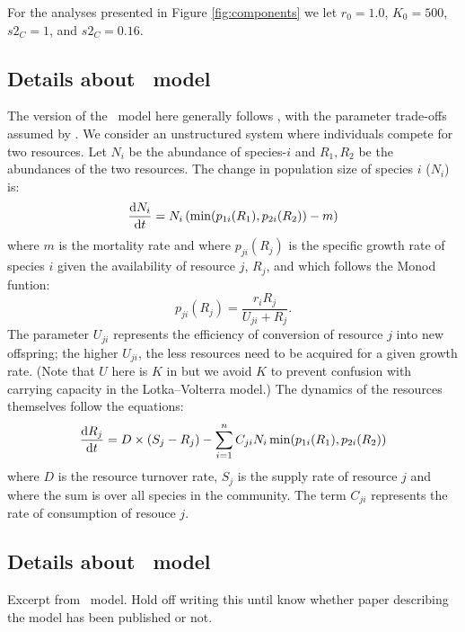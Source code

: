 \documentclass[a4paper,11pt]{article}
\begin{document}
For the analyses presented in Figure \ref{fig:components} we let $r_0=1.0$, $K_0=500$,
 $s2_C=1$, and $s2_C=0.16$.

\subsection{Details about \Rstar\ model}\label{sec:Rstar}

The version of the \Rstar\ model here generally follows
\citet{Huisman-2001}, with the parameter trade-offs assumed by
\citet{Fox-2008}.
%
We consider an unstructured system where individuals compete for two
resources. Let $N_i$ be the abundance of species-$i$ and $R_1, R_2$ be
the abundances of the two resources.
%
The change in population size of species $i$ ($N_i$) is:
\begin{equation}
  \label{eq:rstar-n}
  \frac{\mathrm{d} N_i}{\mathrm{d} t} = N_i \, (\min(p_{1i}(R_1), p_{2i}(R_2)) - m)
\end{equation}
where $m$ is the mortality rate and where $p_{ji}(R_j)$ is the
specific growth rate of species $i$ given the availability of resource
$j$, $R_j$, and which follows the Monod funtion:
\begin{equation}
  \label{eq:rstar-p}
  p_{ji}(R_j) = \frac{r_i R_j}{U_{ji} + R_j}.
\end{equation}
%
The parameter $U_{ji}$ represents the efficiency of conversion of
resource $j$ into new offspring; the higher $U_{ji}$, the less
resources need to be acquired for a given growth rate.  (Note that $U$
here is $K$ in \citealt{Huisman-2001} but we avoid $K$ to prevent
confusion with carrying capacity in the Lotka--Volterra model.)
%
The dynamics of the resources themselves follow the equations:
\begin{equation}
  \label{eq:rstar-r}
  \frac{\mathrm{d} R_j}{\mathrm{d} t} =
  D \times (S_j - R_j) - \sum_{i=1}^n {C_{ji} N_i
    \min(p_{1i}(R_1), p_{2i}(R_2))}
\end{equation}
where $D$ is the resource turnover rate, $S_j$ is the supply rate of
resource $j$ and where the sum is over all species in the community.
The term $C_{ji}$ represents the rate of consumption of resouce $j$.


\subsection{Details about \plant\ model}\label{sec:plant}

Excerpt from  \plant\ model. Hold off writing this until know whether paper describing
the model has been published or not.
\end{document}
